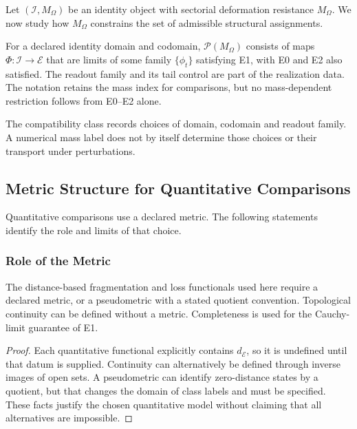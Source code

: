 Let $(\mathcal{I}, M_\Omega)$ be an identity object with sectorial deformation resistance $M_\Omega$. We now study how $M_\Omega$ constrains the set of admissible structural assignments.

\begin{definition}\label{def:compat-class}
For a declared identity domain and codomain, $\mathcal P(M_\Omega)$ consists of maps $\Phi:\mathcal I\to\mathcal E$ that are limits of some family $\{\phi_t\}$ satisfying E1, with E0 and E2 also satisfied. The readout family and its tail control are part of the realization data. The notation retains the mass index for comparisons, but no mass-dependent restriction follows from E0--E2 alone.
\end{definition}

\begin{remark}
The compatibility class records choices of domain, codomain and readout family. A numerical mass label does not by itself determine those choices or their transport under perturbations.
\end{remark}

\subsection{Metric Structure for Quantitative Comparisons}

Quantitative comparisons use a declared metric. The following statements identify the role and limits of that choice.



\subsubsection{Role of the Metric}

\begin{theorem}\label{thm:h3-necessary}
The distance-based fragmentation and loss functionals used here require a declared metric, or a pseudometric with a stated quotient convention. Topological continuity can be defined without a metric. Completeness is used for the Cauchy-limit guarantee of E1.
\end{theorem}

\begin{proof}
Each quantitative functional explicitly contains $d_{\mathcal E}$, so it is undefined until that datum is supplied. Continuity can alternatively be defined through inverse images of open sets. A pseudometric can identify zero-distance states by a quotient, but that changes the domain of class labels and must be specified. These facts justify the chosen quantitative model without claiming that all alternatives are impossible.
\end{proof}


